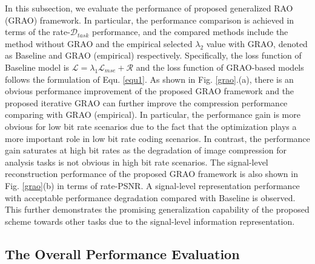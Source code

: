 \documentclass[transmag]{IEEEtran}
\begin{document}
In this subsection, we evaluate the performance of proposed  generalized RAO (GRAO) framework. 
In particular, the performance comparison is achieved in terms of the rate-$\mathcal{D}_{task}$ performance, and the compared methods include the method 
without GRAO and the empirical selected $\lambda_{2}$ value with GRAO, denoted as Baseline and GRAO (empirical) respectively. Specifically, the loss function of Baseline model is $\mathcal{L}=\lambda_{1}\mathcal{L}_{mse}+\mathcal{R}$ and the loss function of GRAO-based models follows the formulation of Equ. \ref{equ1}.
As shown in Fig. \ref{grao}.(a), there is an obvious performance improvement of the proposed GRAO framework and the proposed iterative GRAO can further improve the compression performance comparing with GRAO (empirical). In particular, the performance gain is more obvious for low bit rate scenarios due to the fact that the optimization plays a more important role in low bit rate coding scenarios. In contrast, the performance gain saturates at high bit rates as the degradation of image compression for analysis tasks is not obvious in high bit rate scenarios.
The signal-level reconstruction performance of the proposed GRAO framework is also shown in Fig. \ref{grao}(b) in terms of rate-PSNR. A signal-level representation performance with acceptable performance degradation compared with Baseline is observed. This further demonstrates the promising generalization capability of the proposed scheme towards other tasks due to the signal-level information representation.


\subsection{The Overall Performance Evaluation}
\end{document}

